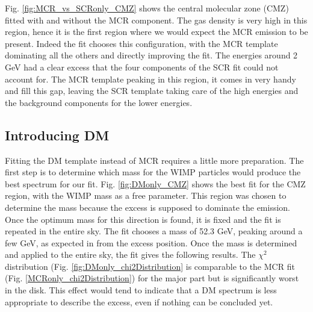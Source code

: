 Fig. \ref{fig:MCR_vs_SCRonly_CMZ} shows the central molecular zone (CMZ) fitted with and without the MCR component. The gas density is very high in this region, hence it is the first region where we would expect the MCR emission to be present. 
Indeed the fit chooses this configuration, with the MCR template dominating all the others and directly improving the fit. The energies around 2 GeV had a clear excess that the four components of the SCR fit could not account for. The MCR template peaking in this region, it comes in very handy and fill this gap, leaving the SCR template taking care of the high energies and the background components for the lower energies.






\subsection{Introducing DM}
%

%
%

Fitting the DM template instead of MCR requires a little more preparation. The first step is to determine which mass for the WIMP particles would produce the best spectrum for our fit. Fig. \ref{fig:DMonly_CMZ} shows the best fit for the CMZ region, with the WIMP mass as a free parameter. This region was chosen to determine the mass because the excess is supposed to dominate the emission. Once the optimum mass for this direction is found, it is fixed and the fit is repeated in the entire sky.
The fit chooses a mass of 52.3 GeV, peaking around a few GeV, as expected in from the excess position.
Once the mass is determined and applied to the entire sky, the fit gives the following results. The $\chi^2$ distribution (Fig. \ref{fig:DMonly_chi2Distribution} is comparable to the MCR fit (Fig. \ref{MCRonly_chi2Distribution}) for the major part but is significantly worst in the disk. This effect would tend to indicate that a DM spectrum is less appropriate to describe the excess, even if nothing can be concluded yet.

